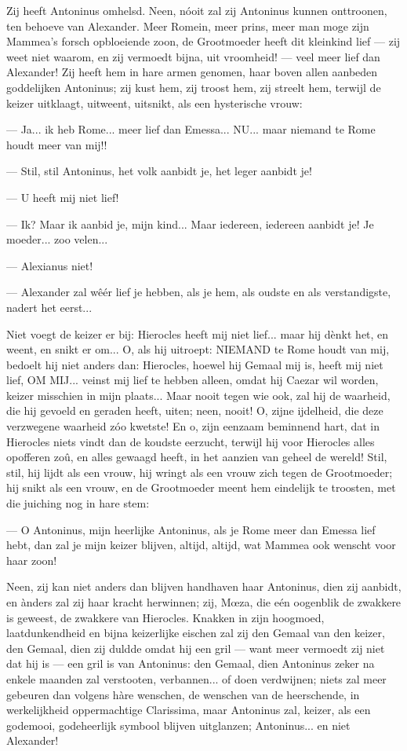 \documentclass[a4paper, 12pt, oneside, dutch]{article}
\begin{document}
Zij heeft Antoninus omhelsd. Neen, nóoit zal zij Antoninus kunnen onttroonen, ten behoeve van Alexander. Meer Romein, meer prins, meer man moge zijn Mammea's forsch opbloeiende zoon, de Grootmoeder heeft dit kleinkind lief --- zij weet niet waarom, en zij vermoedt bijna, uit vroomheid! --- veel meer lief dan Alexander! Zij heeft hem in hare armen genomen, haar boven allen aanbeden goddelijken Antoninus; zij kust hem, zij troost hem, zij streelt hem, terwijl de keizer uitklaagt, uitweent, uitsnikt, als een hysterische vrouw:

--- Ja... ik heb Rome... meer lief dan Emessa... NU... maar niemand te Rome houdt meer van mij!!

--- Stil, stil Antoninus, het volk aanbidt je, het leger aanbidt je!

--- U heeft mij niet lief!

--- Ik? Maar ik aanbid je, mijn kind... Maar iedereen, iedereen aanbidt je! Je moeder... zoo velen...

--- Alexianus niet!

--- Alexander zal wêér lief je hebben, als je hem, als oudste en als verstandigste, nadert het eerst...

Niet voegt de keizer er bij: Hierocles heeft mij niet lief... maar hij dènkt het, en weent, en snikt er om... O, als hij uitroept: NIEMAND te Rome houdt van mij, bedoelt hij niet anders dan: Hierocles, hoewel hij Gemaal mij is, heeft mij niet lief, OM MIJ... veinst mij lief te hebben alleen, omdat hij Caezar wil worden, keizer misschien in mijn plaats... Maar nooit tegen wie ook, zal hij de waarheid, die hij gevoeld en geraden heeft, uiten; neen, nooit! O, zijne ijdelheid, die deze verzwegene waarheid zóo kwetste! En o, zijn eenzaam beminnend hart, dat in Hierocles niets vindt dan de koudste eerzucht, terwijl hij voor Hierocles alles opofferen zoû, en alles gewaagd heeft, in het aanzien van geheel de wereld! Stil, stil, hij lijdt als een vrouw, hij wringt als een vrouw zich tegen de Grootmoeder; hij snikt als een vrouw, en de Grootmoeder meent hem eindelijk te troosten, met die juiching nog in hare stem:

--- O Antoninus, mijn heerlijke Antoninus, als je Rome meer dan Emessa lief hebt, dan zal je mijn keizer blijven, altijd, altijd, wat Mammea ook wenscht voor haar zoon!

Neen, zij kan niet anders dan blijven handhaven haar Antoninus, dien zij aanbidt, en ànders zal zij haar kracht herwinnen; zij, Mœza, die eén oogenblik de zwakkere is geweest, de zwakkere van Hierocles. Knakken in zijn hoogmoed, laatdunkendheid en bijna keizerlijke eischen zal zij den Gemaal van den keizer, den Gemaal, dien zij duldde omdat hij een gril --- want meer vermoedt zij niet dat hij is --- een gril is van Antoninus: den Gemaal, dien Antoninus zeker na enkele maanden zal verstooten, verbannen... of doen verdwijnen; niets zal meer gebeuren dan volgens hàre wenschen, de wenschen van de heerschende, in werkelijkheid oppermachtige Clarissima, maar Antoninus zal, keizer, als een godemooi, godeheerlijk symbool blijven uitglanzen; Antoninus... en niet Alexander!
\end{document}
